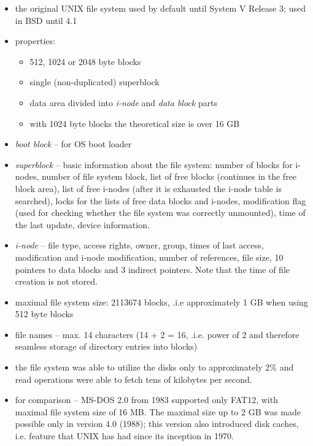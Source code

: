 

\begin{slide}
\begin{center}

\end{center}
\end{slide}

\begin{itemize}
\item the original UNIX file system used by default until System V Release 3;
used in BSD until 4.1
\item properties:
    \begin{itemize}
    \item 512, 1024 or 2048 byte blocks
    \item single (non-duplicated) superblock
    \item data area divided into \emph{i-node} and \emph{data block} parts
    \item with 1024 byte blocks the theoretical size is over 16 GB
    \end{itemize}
\item \emph{boot block} -- for OS boot loader
\item \emph{superblock} -- basic information about the file system: number of
blocks for i-nodes, number of file system block, list of free blocks (continues
in the free block area), list of free i-nodes (after it is exhausted the i-node
table is searched), locks for the lists of free data blocks and i-nodes,
modification flag (used for checking whether the file system was correctly
unmounted), time of the last update, device information.
\item \emph{i-node} -- file type, access rights, owner, group, times of last
access, modification and i-node modification, number of references, file size,
10 pointers to data blocks and 3 indirect pointers. Note that the time of file
creation is not stored.
\item maximal file system size: 2113674 blocks, .i.e approximately 1 GB when
using 512 byte blocks
\item file names -- max. 14 characters (14 + 2 = 16, .i.e. power of 2 and
therefore seamless storage of directory entries into blocks)
\item the file system was able to utilize the disks only to approximately 2\%
and read operations were able to fetch tens of kilobytes per second.
\item for comparison -- MS-DOS 2.0 from 1983 supported only FAT12, with maximal
file system size of 16 MB. The maximal size up to 2 GB was made possible only in
version 4.0 (1988); this version also introduced disk caches, i.e. feature that
UNIX has had since its inception in 1970.
\end{itemize}

